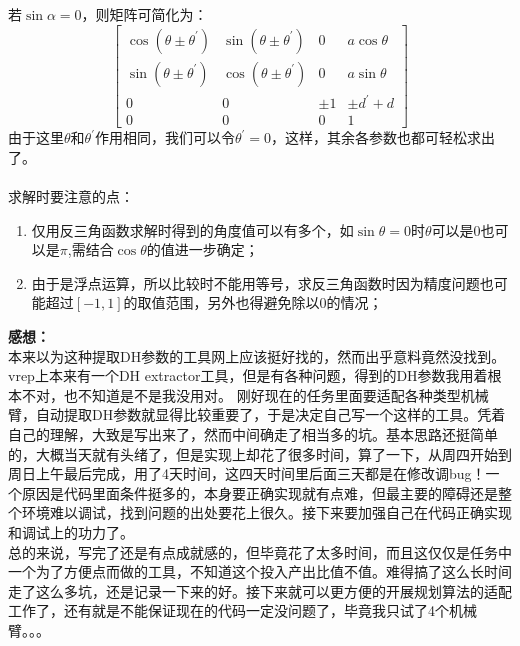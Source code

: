 \documentclass{article}
\begin{document}
\begin{CJK}{UTF8}{song}
若$\sin\alpha=0$，则矩阵可简化为：
$$
\left[ \begin{array}{cccc}
         \cos(\theta\pm\theta^\prime) & \sin(\theta\pm\theta^\prime) & 0 & a\cos\theta \\
         \sin(\theta\pm\theta^\prime) & \cos(\theta\pm\theta^\prime) & 0 & a\sin\theta \\
         0 & 0 & \pm 1 & \pm d^\prime+d \\
         0 & 0 & 0 & 1
       \end{array}
\right]
$$
由于这里$\theta$和$\theta^\prime$作用相同，我们可以令$\theta^\prime=0$，这样，其余各参数也都可轻松求出了。\\
\\
求解时要注意的点：
\begin{enumerate}
\item 仅用反三角函数求解时得到的角度值可以有多个，如$\sin\theta=0$时$\theta$可以是0也可以是$\pi$,需结合$\cos\theta$的值进一步确定；
\item 由于是浮点运算，所以比较时不能用等号，求反三角函数时因为精度问题也可能超过$[-1,1]$的取值范围，另外也得避免除以0的情况；
\end{enumerate}


\textbf{感想：}\\
本来以为这种提取DH参数的工具网上应该挺好找的，然而出乎意料竟然没找到。
vrep上本来有一个DH extractor工具，但是有各种问题，得到的DH参数我用着根本不对，也不知道是不是我没用对。
刚好现在的任务里面要适配各种类型机械臂，自动提取DH参数就显得比较重要了，于是决定自己写一个这样的工具。凭着自己的理解，大致是写出来了，然而中间确走了相当多的坑。基本思路还挺简单的，大概当天就有头绪了，但是实现上却花了很多时间，算了一下，从周四开始到周日上午最后完成，用了4天时间，这四天时间里后面三天都是在修改调bug！一个原因是代码里面条件挺多的，本身要正确实现就有点难，但最主要的障碍还是整个环境难以调试，找到问题的出处要花上很久。接下来要加强自己在代码正确实现和调试上的功力了。\\
总的来说，写完了还是有点成就感的，但毕竟花了太多时间，而且这仅仅是任务中一个为了方便点而做的工具，不知道这个投入产出比值不值。难得搞了这么长时间走了这么多坑，还是记录一下来的好。接下来就可以更方便的开展规划算法的适配工作了，还有就是不能保证现在的代码一定没问题了，毕竟我只试了4个机械臂。。。
\end{CJK}
\end{document}
